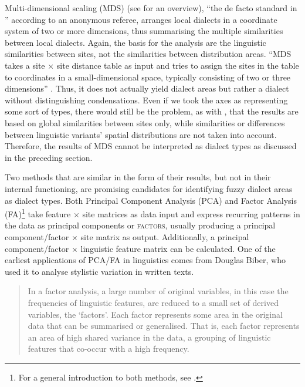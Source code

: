 \documentclass[output=paper]{LSP/langsci}
\begin{document}
Multi-dimensional scaling (MDS) (see \citealt[245]{wieling_advances_2015} for an overview), “the de facto standard in ” according to an anonymous referee, arranges local dialects in a coordinate system of two or more dimensions, thus summarising the multiple similarities between local dialects. Again, the basis for the analysis are the linguistic similarities between sites, not the similarities between distribution areas. “MDS takes a site × site distance table as input and tries to assign the sites in the table to coordinates in a small-dimensional space, typically consisting of two or three dimensions” \citep[245]{wieling_advances_2015}. Thus, it does not actually yield dialect areas but rather a dialect  without distinguishing condensations. Even if we took the axes as representing some sort of types, there would still be the problem, as with , that the results are based on global similarities between sites only, while similarities or differences between linguistic variants’ spatial distributions are not taken into account. Therefore, the results of MDS cannot be interpreted as dialect types as discussed in the preceding section.

\largerpage[-1]
Two methods that are similar in the form of their results, but not in their internal functioning, are promising candidates for identifying fuzzy dialect areas as dialect types. Both Principal Component Analysis  (PCA) and Factor Analysis (FA)\footnote{For a general introduction to both methods, see \citet{tabachnick_using_2012}.} take feature × site matrices as data input and express recurring patterns in the data as principal components or \textsc{factors}, usually producing a principal component/factor × site matrix as output. Additionally, a principal component/factor × linguistic feature matrix can be calculated. One of the earliest applications of PCA/FA in linguistics comes from Douglas Biber, who used it to analyse stylistic variation in written texts.

\begin{quote}
In a factor analysis, a large number of original variables, in this case the frequencies of linguistic features, are reduced to a small set of derived variables, the `factors'. Each factor represents some area in the original data that can be summarised or generalised. That is, each factor represents an area of high shared variance in the data, a grouping of linguistic features that co-occur with a high frequency. \citep[79]{biber_variation_1988}
\end{quote}
\end{document}
